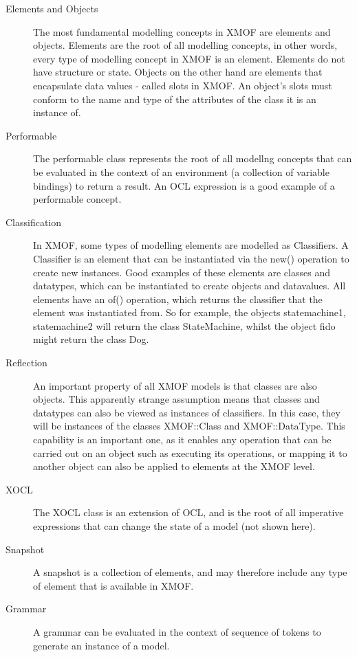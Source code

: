 \begin{description}
\item[Elements and Objects] The most fundamental modelling concepts in XMOF are
elements and objects. Elements are the root of all modelling
concepts, in other words, every type of modelling concept in XMOF
is an element. Elements do not have structure or state. Objects on
the other hand are elements that encapsulate data values - called
slots in XMOF. An object's slots must conform to the name and type
of the attributes of the class it is an instance of.
\item[Performable] The performable class represents the root of all modellng
concepts that can be evaluated in the context of an environment (a collection
of variable bindings) to return a result. An OCL expression is a good example
of a performable concept.
\item[Classification] In XMOF, some types of modelling elements
are modelled as Classifiers. A Classifier is an element that can
be instantiated via the new() operation to create new instances.
Good examples of these elements are classes and datatypes, which
can be instantiated to create objects and datavalues. All elements
have an of() operation, which returns the classifier that the
element was instantiated from. So for example, the objects
statemachine1, statemachine2 will return the class StateMachine,
whilst the object fido might return the class Dog.
\item[Reflection]
An important property of all XMOF models is that classes are also
objects. This apparently strange assumption means that classes and
datatypes can also be viewed as instances of classifiers. In this
case, they will be instances of the classes XMOF::Class and
XMOF::DataType. This capability is an important one, as it enables
any operation that can be carried out on an object such as
executing its operations, or mapping it to another object can also
be applied to elements at the XMOF level.
\item[XOCL] The XOCL class is an extension of OCL, and is the root of all
imperative expressions that can change the state of a model (not shown here).
\item[Snapshot] A snapshot is a collection of elements, and may therefore
include any type of element that is available in XMOF.
\item[Grammar] A grammar can be evaluated in the context of sequence of
tokens to generate an instance of a model.
\end{description}

